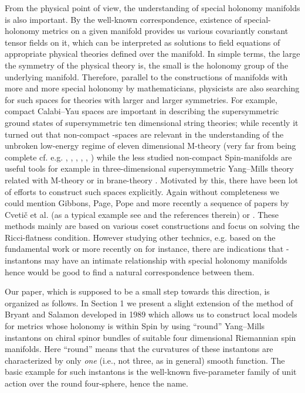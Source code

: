 \documentclass[a4paper,12pt,draft]{article}
\begin{document}
From the physical point of view, the understanding of special holonomy
manifolds is also important. By the well-known correspondence, existence
of special-holonomy metrics on a given manifold provides us various
covariantly constant tensor fields on it, which can be interpreted as
solutions to field equations of appropriate physical theories defined over
the manifold. In simple terms, the large the symmetry of the physical
theory is, the small is the holonomy group of the underlying
manifold. Therefore, parallel to the constructions of manifolds with
more and more special holonomy by mathematicians, physicists are also
searching for such spaces for theories
with larger and larger symmetries. For example, compact Calabi--Yau spaces
are important in describing  the supersymmetric ground states of
supersymmetric ten dimensional string theories; while recently it turned
out that non-compact \coordHE{}-spaces are relevant in the understanding of the
unbroken \coordHE{} low-energy regime of eleven dimensional M-theory
(very far from being complete cf. e.g. \cite{ach1},
\cite{ach2}, \cite{ach-wit}, \cite{ati-mal-vaf},
\cite{ati-wit}, \cite{wit}) while the less studied non-compact
Spin\coordHE{}-manifolds are useful tools for example in three-dimensional
\coordHE{} supersymmetric Yang--Mills theory related with M-theory
\cite{guk-spa} or in brane-theory \cite{cve-gib-lu-pop}. Motivated by
this, there have been lot of efforts to construct such spaces explicitly.
Again without completeness we could mention Gibbons, Page,
Pope \cite{gib-pag-pop} and more recently a sequence of papers by Cveti\v
c et al. (as a typical example see \cite{cve-gib-lu-pop} and the
references therein) or \cite{guk-spa}. These
methods mainly are based on various coset constructions
and focus on solving the Ricci-flatness condition. However studying
other technics, e.g. based on the fundamental work \cite{bry-sal} or
more recently on \cite{bak-flo-keh} for instance, there
are indications that \coordHE{}-instantons may have an intimate relationship
with special holonomy manifolds hence would be good to find a natural
correspondence between them.  

Our paper, which is supposed to be a small step towards this direction, is
organized as follows. In Section 1 we present a slight
extension of the method of Bryant and Salamon developed in
1989 \cite{bry-sal} which allows us to construct local models for metrics
whose holonomy is within Spin\coordHE{} by using ``round'' \coordHE{} Yang--Mills
instantons on chiral spinor bundles of suitable four dimensional
Riemannian spin manifolds. Here ``round'' means that the curvatures of
these instantons are characterized by only {\it one} (i.e., not three, as
in general) smooth function. The basic example for such instantons is the
well-known five-parameter family of unit action over the round
four-sphere, hence the name. 
\end{document}
